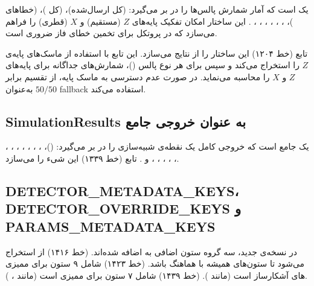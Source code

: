  یک  است که آمار شمارش پالس‌ها را در بر می‌گیرد:  (کل ارسال‌شده)،  (کل )،  (خطاهای )، ، ، ، ، ، ، . این ساختار امکان تفکیک پایه‌های $Z$ (مستقیم) و $X$ (قطری) را فراهم می‌سازد که در پروتکل  برای تخمین خطای فاز ضروری است.

تابع  (خط ۱۲۰۴) این ساختار را از نتایج  می‌سازد. این تابع با استفاده از  ماسک‌های پایه‌ی $Z$ را استخراج می‌کند و سپس برای هر نوع پالس ()، شمارش‌های جداگانه برای پایه‌های $Z$ و $X$ را محاسبه می‌نماید. در صورت عدم دسترسی به ماسک پایه، از تقسیم برابر $50/50$ به‌عنوان fallback استفاده می‌کند.

\subsection{SimulationResults به عنوان خروجی جامع}

 یک  جامع است که خروجی کامل یک نقطه‌ی شبیه‌سازی را در بر می‌گیرد:  ()، ، ، ، ، ، ، ، ، ، ، ، ، و . تابع  (خط ۱۳۳۹) این شیء را می‌سازد.

\subsection{DETECTOR\_METADATA\_KEYS، DETECTOR\_OVERRIDE\_KEYS و PARAMS\_METADATA\_KEYS}

در نسخه‌ی جدید، سه گروه ستون اضافی به  اضافه شده‌اند.  (خط ۱۴۱۶) از  استخراج می‌شود تا ستون‌های  همیشه با  هماهنگ باشد.  (خط ۱۴۲۳) شامل ۹ ستون برای ممیزی های آشکارساز است (مانند ).  (خط ۱۴۳۹) شامل ۷ ستون برای ممیزی  است (مانند ، ).

